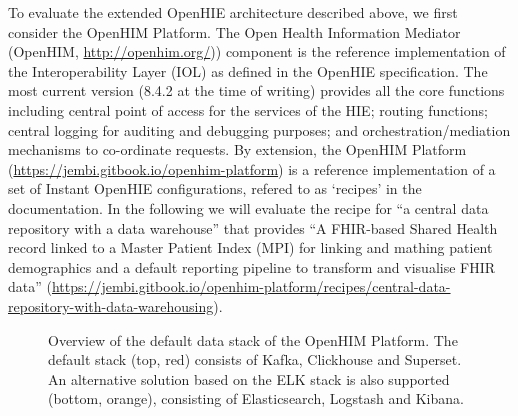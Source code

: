 \documentclass[
  authoryear]{elsarticle}
\begin{document}
To evaluate the extended OpenHIE architecture described above, we first
consider the OpenHIM Platform. The Open Health Information Mediator
(OpenHIM, \href{OpenHIMhttp://openhim.org/}{http://openhim.org/}))
component is the reference implementation of the Interoperability Layer
(IOL) as defined in the OpenHIE specification. The most current version
(8.4.2 at the time of writing) provides all the core functions including
central point of access for the services of the HIE; routing functions;
central logging for auditing and debugging purposes; and
orchestration/mediation mechanisms to co-ordinate requests. By
extension, the OpenHIM Platform
(\url{https://jembi.gitbook.io/openhim-platform}) is a reference
implementation of a set of Instant OpenHIE configurations, refered to as
`recipes' in the documentation. In the following we will evaluate the
recipe for ``a central data repository with a data warehouse'' that
provides ``A FHIR-based Shared Health record linked to a Master Patient
Index (MPI) for linking and mathing patient demographics and a default
reporting pipeline to transform and visualise FHIR data''
(\url{https://jembi.gitbook.io/openhim-platform/recipes/central-data-repository-with-data-warehousing}).

\begin{figure}


\caption{\label{fig-openhim-platform}Overview of the default data stack
of the OpenHIM Platform. The default stack (top, red) consists of Kafka,
Clickhouse and Superset. An alternative solution based on the ELK stack
is also supported (bottom, orange), consisting of Elasticsearch,
Logstash and Kibana.}

\end{figure}%
\end{document}
